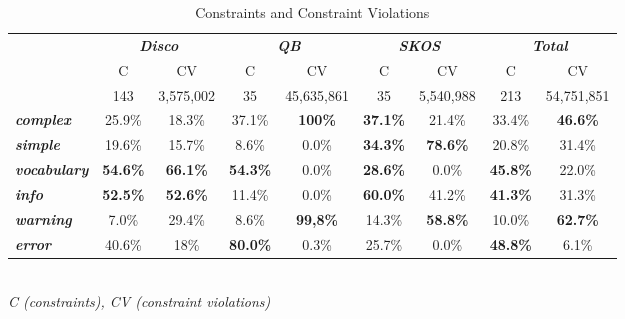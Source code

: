\documentclass{llncs}
\begin{document}
{{\begin{table}[H]
		\scriptsize
    \begin{center}
    \begin{tabular}{@{}lcccccccc@{}}
		\hline
    \multirow{2}{*}{} &
      \multicolumn{2}{c}{\textbf{\emph{Disco}}} &
      \multicolumn{2}{c}{\textbf{\emph{QB}}} &
      \multicolumn{2}{c}{\textbf{\emph{SKOS}}} &
      \multicolumn{2}{c}{\textbf{\emph{Total}}} \\
    \textbf{} & C & CV & C & CV & C & CV & C & CV \\
    \hline
		 & 143 & 3,575,002 & 35 & 45,635,861 & 35 & 5,540,988 & 213 & 54,751,851 \\
		\hline
		\textbf{\emph{complex}} & 25.9\% & 18.3\% & 37.1\% & \textbf{100\%} & \textbf{37.1\%} & 21.4\% & 33.4\% & \textbf{46.6\%} \\
		\textbf{\emph{simple}} & 19.6\% & 15.7\% & 8.6\% & 0.0\% & \textbf{34.3\%} & \textbf{78.6\%} & 20.8\% & 31.4\% \\
		\textbf{\emph{vocabulary}} & \textbf{54.6\%} & \textbf{66.1\%} & \textbf{54.3\%} & 0.0\% & \textbf{28.6\%} & 0.0\% & \textbf{45.8\%} & 22.0\% \\
		\hline
		\textbf{\emph{info}} & \textbf{52.5\%} & \textbf{52.6\%} & 11.4\% & 0.0\% & \textbf{60.0\%} & 41.2\% & \textbf{41.3\%} & 31.3\% \\
		\textbf{\emph{warning}} & 7.0\% & 29.4\% & 8.6\% & \textbf{99,8\%} & 14.3\% & \textbf{58.8\%} & 10.0\% & \textbf{62.7\%} \\
		\textbf{\emph{error}} & 40.6\% & 18\% & \textbf{80.0\%} & 0.3\% & 25.7\% & 0.0\% & \textbf{48.8\%} & 6.1\%\\
    \bottomrule
    \end{tabular}
    \\ \emph{C (constraints), CV (constraint violations)}
    \caption{Constraints and Constraint Violations}
		\label{tab:evaluation-constraint-violations}
    \end{center}
\end{table}

}}
\end{document}
